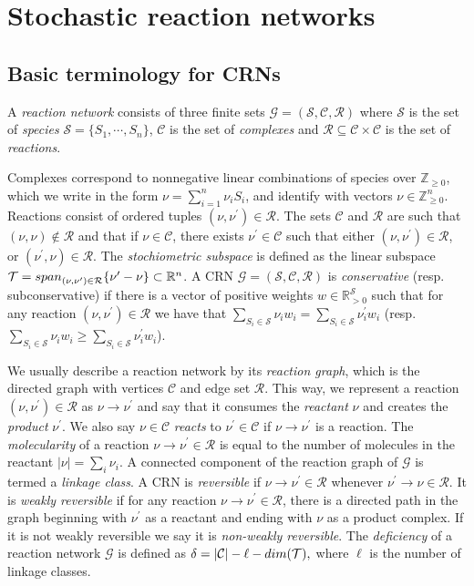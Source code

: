 \documentclass{amsart}
\theoremstyle{definition}
\theoremstyle{remark}
\theoremstyle{Conjecture/open problem}
\theoremstyle{assumption}
\theoremstyle{conjecture}
\def\p{^{\prime}}
\def\cG{\mathcal{G}}
\def\cR{\mathcal{R}}
\def\cS{\mathcal{S}}
\def\cC{\mathcal{C}}
\def\R{\mathbb{R}}
\def\Z{\mathbb{Z}}
\numberwithin{equation}{section}
\begin{document}
\section{Stochastic reaction networks}\label{RN} \label{modelCRN}
\subsection{Basic terminology for CRNs}\label{reaction_basic}

A \emph{reaction network} consists of three finite sets $\cG=(\cS,\cC,\cR)$ where
 $\cS$ is the set of \emph{species} $\cS=\{S_1,\cdots,S_n\}$, $\cC$ is the set of \emph{complexes} and $\cR\subseteq \cC\times\cC$ is the set of \emph{reactions}.  

Complexes correspond to nonnegative linear combinations of species over $\Z_{\geq 0}$, which we write in the form
$\nu=\sum_{i=1}^n\nu_i S_i$, and identify with vectors $\nu\in\Z_{\geq 0}^n$. 
 Reactions consist of ordered tuples $(\nu, \nu\p)\in \cR$. The sets $\cC$ and $\cR$ are such that $(\nu , \nu )\not\in \cR$ and that if $\nu \in \cC$, there exists $\nu \p \in\cC$ such that either $(\nu , \nu \p)\in\cR$, or $(\nu \p,\nu )\in\cR$. The \emph{stochiometric subspace} is defined as the linear subspace $\mathcal{T}={\rm span}_{(\nu , \nu \p)\in\cR}\{\nu\p-\nu\}\subset \mathbb{R}^n$.  A CRN
  $\cG=(\cS,\cC,\cR)$  is \emph{conservative} (resp. subconservative) if there is a vector of positive weights $w\in \R^\cS_{>0}$ such that for any reaction $(\nu , \nu \p)\in\cR$ we have that $\sum_{S_i\in\cS}\nu_i w_i=\sum_{S_i\in\cS}\nu\p_i w_i$ (resp. $\sum_{S_i\in\cS}\nu_i w_i\geq\sum_{S_i\in\cS}\nu\p_i w_i$).
 
 
We usually describe a reaction network by its \emph{reaction graph}, which is the directed graph with vertices $\cC$ and edge set $\cR$. This way, we represent a reaction $(\nu , \nu \p)\in\cR$ as $\nu \to \nu \p$ and say that it consumes the \emph{reactant} $\nu$ and creates the \emph{product} $\nu\p$. We also say $\nu \in \cC$ \emph{reacts} to $\nu\p \in \cC$ if $\nu\to \nu\p$ is a reaction. The \emph{molecularity} of a reaction $\nu\to \nu\p \in\cR$ is equal to the number of molecules in the reactant $|\nu|=\sum_i \nu_i$. A connected component of the reaction graph of $\cG$ is termed a \emph{linkage class}. A CRN is \emph{reversible} if $\nu\to \nu\p \in\cR$ whenever $ \nu\p\to \nu \in\cR$. It is \emph{weakly reversible} if for any reaction $\nu\to \nu\p \in\cR$, there is a directed path in the graph beginning with $\nu\p$ as a reactant and ending with $\nu$ as a product complex. If it is not weakly reversible we say it is \emph{non-weakly reversible}. The \emph{deficiency}  of a reaction network $\cG$ is defined as $\delta=|\cC|-\ell-{\rm dim}(\mathcal{T}),$
 where $\ell$ is the number of linkage classes.  
	
\end{document}
